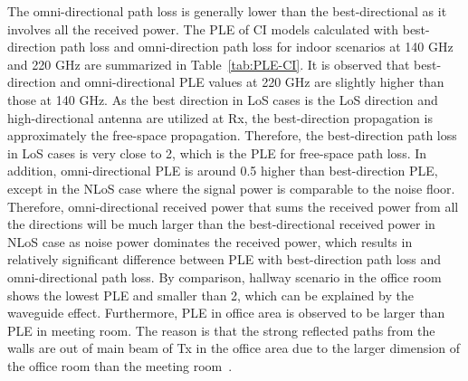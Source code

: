 \documentclass[conference]{IEEEtran}
\begin{document}
\par The omni-directional path loss is generally lower than the best-directional as it involves all the received power. The PLE of CI models calculated with best-direction path loss and omni-direction path loss for indoor scenarios at 140 GHz and 220 GHz are summarized in Table~\ref{tab:PLE-CI}. It is observed that best-direction and omni-directional PLE values at 220 GHz are slightly higher than those at 140 GHz. As the best direction in LoS cases is the LoS direction and high-directional antenna are utilized at Rx, the best-direction propagation is approximately the free-space propagation. Therefore, the best-direction path loss in LoS cases is very close to 2, which is the PLE for free-space path loss. In addition, omni-directional PLE is around 0.5 higher than best-direction PLE, except in the NLoS case where the signal power is comparable to the noise floor. Therefore, omni-directional received power that sums the received power from all the directions will be much larger than the best-directional received power in NLoS case as noise power dominates the received power, which results in relatively significant difference between PLE with best-direction path loss and omni-directional path loss. By comparison, hallway scenario in the office room shows the lowest PLE and smaller than 2, which can be explained by the waveguide effect. Furthermore, PLE in office area is observed to be larger than PLE in meeting room. The reason is that the strong reflected paths from the walls are out of main beam of Tx in the office area due to the larger dimension of the office room than the meeting room~\cite{yi2021Channel}. 
\end{document}
